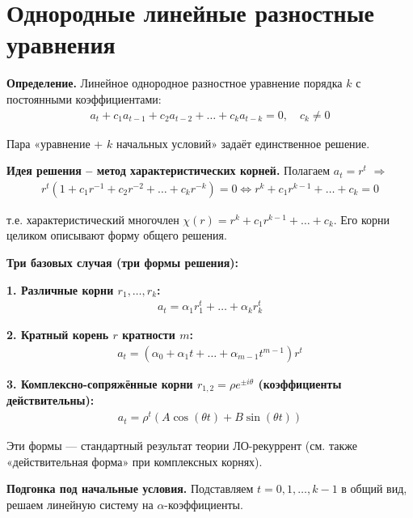 \section{Однородные линейные разностные уравнения}\label{sec:homogeneous}

\begin{center}
\end{center}

\textbf{Определение.} Линейное однородное разностное уравнение порядка $k$ с постоянными коэффициентами:
\begin{align}
a_t + c_1 a_{t-1} + c_2 a_{t-2} + \dots + c_k a_{t-k} = 0, \quad c_k \neq 0
\end{align}

Пара «уравнение + $k$ начальных условий» задаёт единственное решение.

\textbf{Идея решения -- метод характеристических корней.} Полагаем $a_t = r^t$ $\Rightarrow$
\begin{align}
r^t (1 + c_1 r^{-1} + c_2 r^{-2} + \dots + c_k r^{-k}) = 0 \iff r^k + c_1 r^{k-1} + \dots + c_k = 0
\end{align}

т.е. характеристический многочлен $\chi(r) = r^k + c_1 r^{k-1} + \dots + c_k$. Его корни целиком описывают форму общего решения.

\textbf{Три базовых случая (три формы решения):}

\textbf{1. Различные корни $r_1, \dots, r_k$:}
\begin{align}
a_t = \alpha_1 r_1^t + \dots + \alpha_k r_k^t
\end{align}

\textbf{2. Кратный корень $r$ кратности $m$:}
\begin{align}
a_t = (\alpha_0 + \alpha_1 t + \dots + \alpha_{m-1} t^{m-1}) r^t
\end{align}

\textbf{3. Комплексно-сопряжённые корни $r_{1,2} = \rho e^{\pm i\theta}$ (коэффициенты действительны):}
\begin{align}
a_t = \rho^t (A \cos(\theta t) + B \sin(\theta t))
\end{align}

Эти формы — стандартный результат теории ЛО-рекуррент (см. также «действительная форма» при комплексных корнях).

\textbf{Подгонка под начальные условия.} Подставляем $t = 0, 1, \dots, k - 1$ в общий вид, решаем линейную систему на $\alpha$-коэффициенты.



